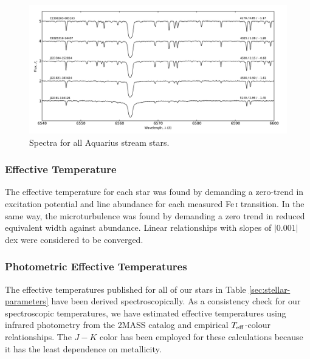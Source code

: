 \documentclass{emulateapj}
\begin{document}
\begin{figure}[t!]
	\includegraphics[width=\textwidth]{./figures/spectra-h-alpha.pdf}
	\caption{Spectra for all Aquarius stream stars.}
	\label{fig:spectra-h-alpha}
\end{figure}

\subsubsection{Effective Temperature}
\label{sec:effective-teffs}
The effective temperature for each star was found by demanding a zero-trend in excitation potential and line abundance for each measured Fe\,\textsc{i} transition. In the same way, the microturbulence was found by demanding a zero trend in reduced equivalent width against abundance. Linear relationships with slopes of $|0.001|$ dex were considered to be converged. 

\subsubsection{Photometric Effective Temperatures}
\label{sec:photometric-temperatures}

The effective temperatures published for all of our stars in Table \ref{sec:stellar-parameters} have been derived spectroscopically. As a consistency check for our spectroscopic temperatures, we have estimated effective temperatures using infrared photometry from the 2MASS catalog and empirical $T_{\rm eff}$-colour relationships. The $J-K$ color has been employed for these calculations because it has the least dependence on metallicity. 
\end{document}
